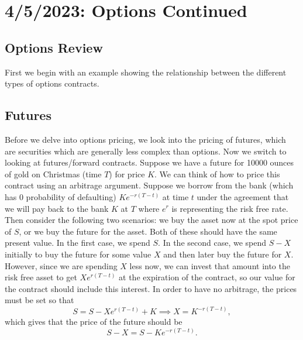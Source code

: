 \chapter{4/5/2023: Options Continued}
\section{Options Review}
First we begin with an example showing the relationship between the different types of options contracts.

\section{Futures}
Before we delve into options pricing, we look into the pricing of futures, which are securities which are generally less complex than options. Now we switch to looking at futures/forward contracts.
Suppose we have a future for 10000 ounces of gold on Christmas (time $T$) for price $K$. We can think of how to price this contract using an arbitrage argument. Suppose we borrow from the bank (which has 0 probability of defaulting) $Ke^{-r(T-t)}$ at time $t$ under the agreement that we will pay back to the bank $K$ at $T$ where $e^r$ is representing the risk free rate. Then consider the following two scenarios: we buy the asset now at the spot price of $S$, or we buy the future for the asset. Both of these should have the same present value. In the first case, we spend $S$. In the second case, we spend $S-X$ initially to buy the future for some value $X$ and then later buy the future for $X$. However, since we are spending $X$ less now, we can invest that amount into the risk free asset to get $Xe^{r(T-t)}$ at the expiration of the contract, so our value for the contract should include this interest. In order to have no arbitrage, the prices must be set so that $$ S = S - Xe^{r(T-t)} + K \implies X = K^{-r(T-t)}, $$ which gives that the price of the future should be $$ S - X = S - Ke^{-r(T-t)}. $$ 

